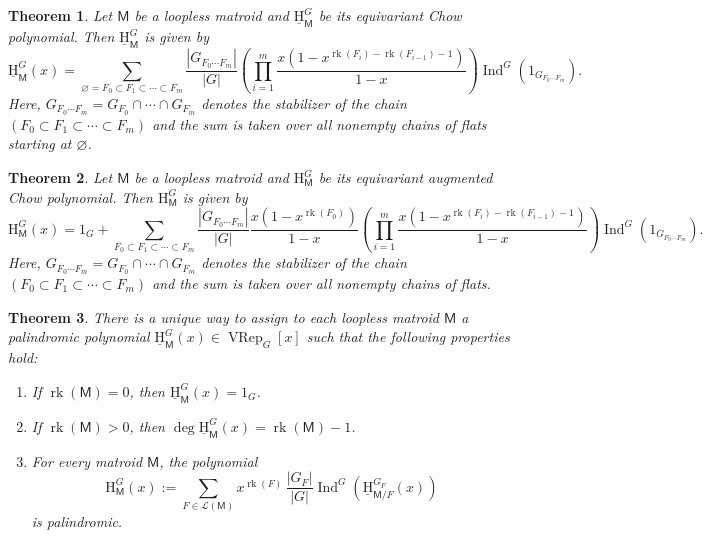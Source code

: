 \documentclass[11pt, a4paper, english]{amsart}
\theoremstyle{teoremas}
\newtheorem{theorem}{Theorem}[section]
\theoremstyle{definition}
\DeclareMathOperator{\rk}{rk}
\newcommand{\M}{\mathsf{M}}
\renewcommand{\H}{\mathrm{H}}
\newcommand{\uH}{\underline{\mathrm{H}}}
\newcommand{\VRep}{\operatorname{VRep}}
\newcommand{\Ind}{\operatorname{Ind}}
\begin{document}
\begin{theorem}\label{thm:main-perm-rep}
    Let $\M$ be a loopless matroid and $\uH_{\M}^G$ be its equivariant Chow polynomial. Then $\uH_{\M}^G$ is given by
    \begin{equation}\label{eqn:main-perm-rep}
        \uH_{\M}^G(x) = \sum_{\varnothing = F_0\subset F_1\subset\cdots\subset F_m}\frac{|G_{F_0\cdots F_m}|}{|G|}
        \left(\prod_{i=1}^{m}{\frac{x(1-x^{\rk(F_i)-\rk(F_{i-1})-1})}{1-x}}\right)
        \Ind^G\left(1_{G_{F_0\cdots F_m}}\right).
    \end{equation}
    Here, $G_{F_0\cdots F_m} = G_{F_0}\cap\cdots\cap G_{F_m}$ denotes the stabilizer of the chain $(F_0\subset F_1\subset\cdots\subset F_m)$
    and the sum is taken over all nonempty chains of flats starting at $\varnothing$.
\end{theorem}

\begin{theorem}\label{thm:main-perm-rep-augmented}
    Let $\M$ be a loopless matroid and $\H_{\M}^G$ be its equivariant augmented Chow polynomial. Then $\H_{\M}^G$ is given by
    \begin{equation}
        \H_{\M}^G(x) = 1_G + \sum_{F_0\subset F_1\subset\cdots\subset F_m}\frac{|G_{F_0\cdots F_m}|}{|G|}
        \frac{x(1-x^{\rk(F_0)})}{1-x}
        \left(\prod_{i=1}^{m}{\frac{x(1-x^{\rk(F_i)-\rk(F_{i-1})-1})}{1-x}}\right)
        \Ind^G\left(1_{G_{F_0\cdots F_m}}\right).
    \end{equation}
    Here, $G_{F_0\cdots F_m} = G_{F_0}\cap\cdots\cap G_{F_m}$ denotes the stabilizer of the chain $(F_0\subset F_1\subset\cdots\subset F_m)$
    and the sum is taken over all nonempty chains of flats.
\end{theorem}

\begin{theorem}\label{thm:equiv-main-recursion-defi-H-and-uH}
    There is a unique way to assign to each loopless matroid $\M$ a palindromic polynomial $\uH_{\M}^G(x) \in \VRep_G[x]$ such that the following properties hold:
    \begin{enumerate}[\normalfont(i)]
        \item If $\rk(\M) = 0$, then $\uH_{\M}^G(x) = 1_G$.\label{it:mainfirst}\
        \item If $\rk(\M) > 0$, then $\deg \uH_{\M}^G(x) = \rk(\M) - 1$.\label{it:mainsecond}
        \item For every matroid $\M$, the polynomial
            \[ \H_{\M}^G(x) := \sum_{F\in \mathcal{L}(\M)} x^{\rk(F)}\, \frac{|G_F|}{|G|}\Ind^G\left(\uH_{\M/F}^{G_F}(x)\right)\]
        is palindromic.\label{it:main-equiv-third}
    \end{enumerate}
\end{theorem}
\end{document}
